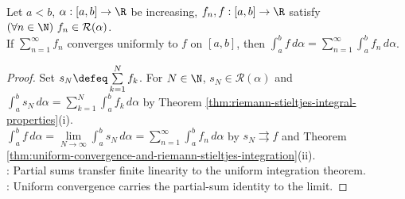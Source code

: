 \begin{corollary} \label{cor:termwise-riemann-stieltjes-integration} \\
Let $a<b$, $\alpha:[a,b]\to\R$ be increasing, $f_n,f:[a,b]\to\R$ satisfy $(\forall n\in\N)\ f_n\in\mathcal{R}(\alpha)$.\\
If $\sum\limits_{n=1}^{\infty}f_n$ converges uniformly to $f$ on $[a,b]$, then $\int_a^b f\,d\alpha=\sum\limits_{n=1}^{\infty}\int_a^b f_n\,d\alpha$.
\begin{proof}
Set $s_N\defeq\sum\limits_{k=1}^{N}f_k$. For $N\in\N$, $s_N\in\mathcal{R}(\alpha)$ and $\int_a^b s_N\,d\alpha=\sum\limits_{k=1}^{N}\int_a^b f_k\,d\alpha$ by Theorem \ref{thm:riemann-stieltjes-integral-properties}(i).\\
$\int_a^b f\,d\alpha=\lim\limits_{N\to\infty}\int_a^b s_N\,d\alpha=\sum\limits_{n=1}^{\infty}\int_a^b f_n\,d\alpha$ by $s_N\rightrightarrows f$ and Theorem \ref{thm:uniform-convergence-and-riemann-stieltjes-integration}(ii).\\
: Partial sums transfer finite linearity to the uniform integration theorem.\\
: Uniform convergence carries the partial-sum identity to the limit.
\end{proof}
\end{corollary}

